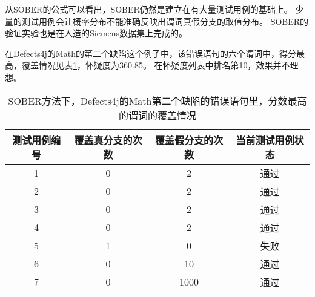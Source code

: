 从SOBER的公式可以看出，SOBER仍然是建立在有大量测试用例的基础上。
少量的测试用例会让概率分布不能准确反映出谓词真假分支的取值分布。
SOBER的验证实验也是在人造的Siemens数据集上完成的。

在Defects4j的Math的第二个缺陷这个例子中，该错误语句的六个谓词中，得分最高，覆盖情况见表\ref{math_2_sober}，怀疑度为360.85。
在怀疑度列表中排名第10，效果并不理想。

\begin{table}
\centering
\begin{tabular}{|c|c|c|c|}
\hline
测试用例编号 & 覆盖真分支的次数 & 覆盖假分支的次数 & 当前测试用例状态 \\
\hline
1 & 0 & 2 & 通过 \\
\hline
2 & 0 & 2 & 通过 \\
\hline
3 & 0 & 2 & 通过 \\
\hline
4 & 0 & 2 & 通过 \\
\hline
5 & 1 & 0 & 失败 \\
\hline
6 & 0 & 10 & 通过 \\
\hline
7 & 0 & 1000 & 通过 \\
\hline
\end{tabular}
\caption{SOBER方法下，Defects4j的Math第二个缺陷的错误语句里，分数最高的谓词的覆盖情况}
\label{math_2_sober}
\end{table}

